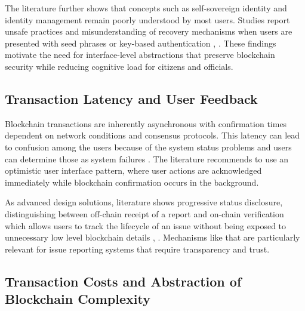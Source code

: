The literature further shows that concepts such as self-sovereign identity and identity management remain poorly understood by most users. Studies report unsafe practices and misunderstanding of recovery mechanisms when users are presented with seed phrases or key-based authentication \cite{oup2022governance}, \cite{fraunhofer2026usability}. These findings motivate the need for interface-level abstractions that preserve blockchain security while reducing cognitive load for citizens and officials.

\subsection{Transaction Latency and User Feedback}

Blockchain transactions are inherently asynchronous with confirmation times dependent on network conditions and consensus protocols. This latency can lead to confusion among  the users because of the system status problems and users can determine those as system failures \cite{sonule2025uxweb3}. The literature recommends to use an optimistic user interface pattern, where user actions are acknowledged immediately while blockchain confirmation occurs in the background.  

As advanced design solutions, literature shows progressive status disclosure, distinguishing between off-chain receipt of a report and on-chain verification which allows users to track the lifecycle of an issue without being exposed to unnecessary low level blockchain details \cite{dzone2026blockchainai}, \cite{marian2025transparent}. Mechanisms like that are particularly relevant for issue reporting systems that require transparency and trust.

\subsection{Transaction Costs and Abstraction of Blockchain Complexity}


